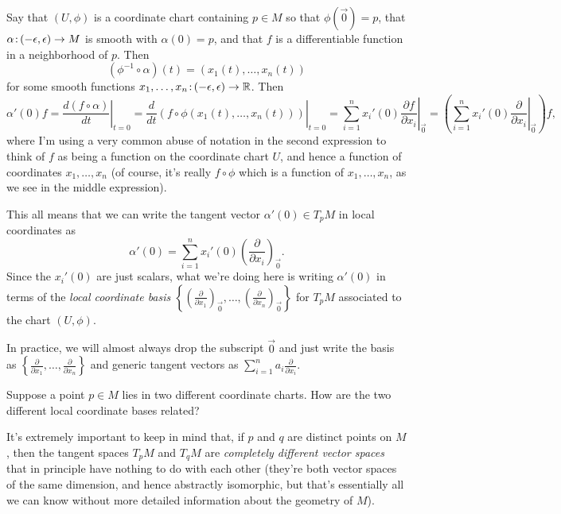 Say that $(U,\phi)$ is a coordinate chart containing $p \in M$ so that $\phi(\vec{0}) = p$, that $\alpha \colon\thinspace\!\! (-\epsilon , \epsilon) \to M$ is smooth with $\alpha(0) = p$, and that $f$ is a differentiable function in a neighborhood of $p$. Then
\[
	(\phi^{-1} \circ \alpha)(t) = (x_1(t), \dots , x_n(t))
\]
for some smooth functions $x_1 , \dots , x_n\colon\thinspace\!\! (-\epsilon, \epsilon) \to \mathbb{R}$. Then
\[
	\alpha'(0) f = \left. \frac{d(f \circ \alpha)}{dt} \right|_{t = 0} = \left. \frac{d}{dt} (f \circ \phi(x_1(t),\dots , x_n(t))) \right|_{t=0} = \left.\sum_{i=1}^n x_i'(0) \frac{\partial f}{\partial x_i}\right|_{\vec{0}} = \left( \left.\sum_{i=1}^n x_i'(0) \frac{\partial }{\partial x_i}\right|_{\vec{0}}\right)f,
\]
where I'm using a very common abuse of notation in the second expression to think of $f$ as being a function on the coordinate chart $U$, and hence a function of coordinates $x_1, \dots , x_n$ (of course, it's really $f \circ \phi$ which is a function of $x_1, \dots , x_n$, as we see in the middle expression).

This all means that we can write the tangent vector $\alpha'(0) \in T_pM$ in local coordinates as
\[
	\alpha'(0) = \sum_{i=1}^n x_i'(0) \left(\frac{\partial}{\partial x_i}\right)_{\vec{0}}.
\]
Since the $x_i'(0)$ are just scalars, what we're doing here is writing $\alpha'(0)$ in terms of the \emph{local coordinate basis} $\left\{\left(\frac{\partial}{\partial x_1}\right)_{\vec{0}}, \dots , \left(\frac{\partial}{\partial x_n}\right)_{\vec{0}}\right\}$ for $T_pM$ associated to the chart $(U,\phi)$.

\begin{remark}
	In practice, we will almost always drop the subscript $\vec{0}$ and just write the basis as $\left\{\frac{\partial}{\partial x_1}, \dots , \frac{\partial}{\partial x_n}\right\}$ and generic tangent vectors as $\sum_{i=1}^n a_i \frac{\partial}{\partial x_i}$.
\end{remark}

\begin{exercise}
	Suppose a point $p \in M$ lies in two different coordinate charts. How are the two different local coordinate bases related?
\end{exercise}

It's extremely important to keep in mind that, if $p$ and $q$ are distinct points on $M$, then the tangent spaces $T_pM$ and $T_qM$ are \emph{completely different vector spaces} that in principle have nothing to do with each other (they're both vector spaces of the same dimension, and hence abstractly isomorphic, but that's essentially all we can know without more detailed information about the geometry of $M$).

